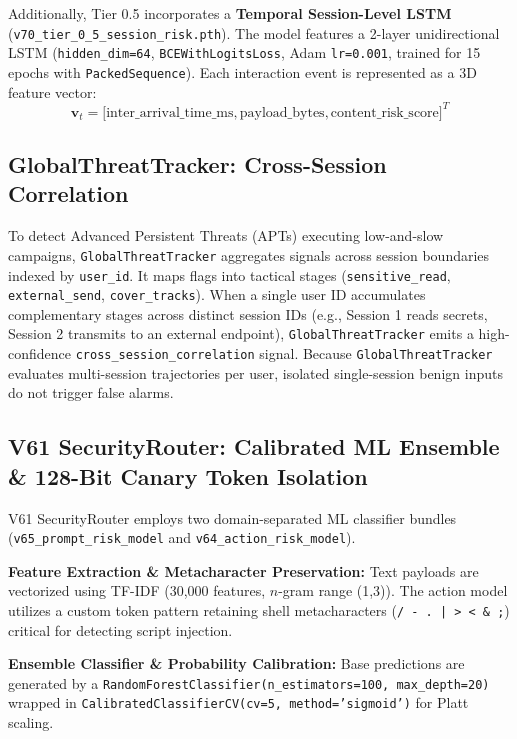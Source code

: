 \documentclass[runningheads]{llncs}
\begin{document}
Additionally, Tier 0.5 incorporates a \textbf{Temporal Session-Level LSTM} (\texttt{v70\_tier\_0\_5\allowbreak\_session\_risk.pth}). The model features a 2-layer unidirectional LSTM (\texttt{hidden\_dim=64}, \texttt{BCEWithLogitsLoss}, Adam \texttt{lr=0.001}, trained for 15 epochs with \texttt{PackedSequence}). Each interaction event is represented as a 3D feature vector:
\begin{equation}
\mathbf{v}_t = \big[\text{inter\_arrival\_time\_ms}, \text{payload\_bytes}, \text{content\_risk\_score}\big]^T
\end{equation}

\subsection{GlobalThreatTracker: Cross-Session Correlation}
To detect Advanced Persistent Threats (APTs) executing low-and-slow campaigns, \texttt{GlobalThreatTracker} aggregates signals across session boundaries indexed by \texttt{user\_id}. It maps flags into tactical stages (\texttt{sensitive\_read}, \texttt{external\_send}, \texttt{cover\_tracks}). When a single user ID accumulates complementary stages across distinct session IDs (e.g., Session 1 reads secrets, Session 2 transmits to an external endpoint), \texttt{GlobalThreatTracker} emits a high-confidence \texttt{cross\_session\_correlation} signal. Because \texttt{GlobalThreatTracker} evaluates multi-session trajectories per user, isolated single-session benign inputs do not trigger false alarms.

\subsection{V61 SecurityRouter: Calibrated ML Ensemble \& 128-Bit Canary Token Isolation}
V61 SecurityRouter employs two domain-separated ML classifier bundles (\texttt{v65\_prompt\allowbreak\_risk\_model} and \texttt{v64\_action\allowbreak\_risk\_model}).

\textbf{Feature Extraction \& Metacharacter Preservation:} Text payloads are vectorized using TF-IDF (30,000 features, $n$-gram range (1,3)). The action model utilizes a custom token pattern retaining shell metacharacters (\texttt{/ - . | > < \& ;}) critical for detecting script injection.

\textbf{Ensemble Classifier \& Probability Calibration:} Base predictions are generated by a \texttt{\small Random\allowbreak Forest\allowbreak Classifier\allowbreak(n\_estimators=100, max\_depth=20)} wrapped in \texttt{\small Calibrated\allowbreak Classifier\allowbreak CV\allowbreak(cv=5, method='sigmoid')} for Platt scaling.
\end{document}
